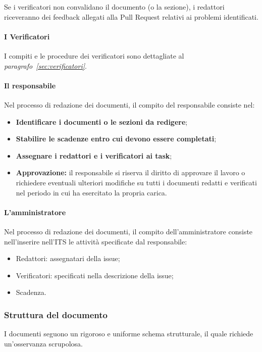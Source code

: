 Se i verificatori non convalidano il documento (o la sezione), i redattori riceveranno dei feedback allegati alla Pull Request relativi ai problemi identificati.

\paragraph{I Verificatori}
I compiti e le procedure dei verificatori sono dettagliate al \textit{paragrafo~\ref{sec:verificatori}}.

\paragraph{Il responsabile}
Nel processo di redazione dei documenti, il compito del responsabile consiste nel:
\begin{itemize}
    \item \textbf{Identificare i documenti o le sezioni da redigere};
    \item \textbf{Stabilire le scadenze entro cui devono essere completati};
    \item \textbf{Assegnare i redattori e i verificatori ai task};
    \item \textbf{Approvazione:} il responsabile si riserva il diritto di approvare il lavoro o richiedere eventuali ulteriori modifiche su tutti i documenti redatti e verificati nel periodo in cui ha esercitato la propria carica.
\end{itemize}

\paragraph{L'amministratore}
Nel processo di redazione dei documenti, il compito dell'amministratore consiste nell'inserire nell'ITS le attività specificate dal responsabile:
    \begin{itemize}
        \item Redattori: assegnatari della issue;
        \item Verificatori: specificati nella descrizione della issue;
        \item Scadenza.
    \end{itemize}

\subsubsection{Struttura del documento}
\label{subsubsec:strutturadocumento}
I documenti seguono un rigoroso e uniforme schema strutturale, il quale richiede un'osservanza scrupolosa.

